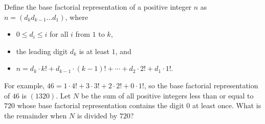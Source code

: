 Define the base factorial representation of a positive integer $n$ as $n=(d_kd_{k-1}\ldots d_1)$, where
\begin{itemize}
\item $0\le d_i\le i$ for all $i$ from $1$ to $k$,
\item the leading digit $d_k$ is at least $1$, and
\item $n=d_k\cdot k!+d_{k-1}\cdot(k-1)!+\cdots+d_2\cdot2!+d_1\cdot1!$.
\end{itemize}
For example, $46=1\cdot4!+3\cdot3!+2\cdot2!+0\cdot1!$, so the base factorial representation of $46$ is $(1320)$. Let $N$ be the sum of all positive integers less than or equal to $720$ whose base factorial representation contains the digit $0$ at least once. What is the remainder when $N$ is divided by $720$?

